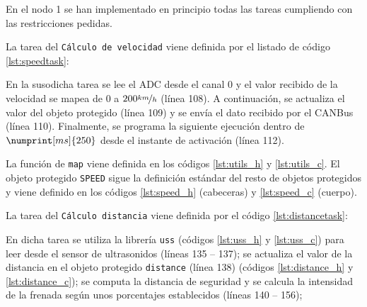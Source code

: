 En el nodo 1 se han implementado en principio todas las tareas cumpliendo con las
restricciones pedidas.

La tarea del \texttt{Cálculo de velocidad} viene definida por el listado de código
\ref{lst:speedtask}:



En la susodicha tarea se lee el ADC desde el canal 0 y el valor recibido de la velocidad
se mapea de $0$ a $200 \nicefrac{km}{h}$ (línea 108). A continuación, se actualiza el valor del
objeto protegido (línea 109) y se envía el dato recibido por el CANBus (línea 110).
Finalmente, se programa la siguiente ejecución dentro de $\numprint[ms]{250}$ desde el
instante de activación (línea 112).

La función de \texttt{map} viene definida en los códigos \ref{lst:utils_h} y \ref{lst:utils_c}.
El objeto protegido \texttt{SPEED} sigue la definición estándar del resto de objetos
protegidos y viene definido en los códigos \ref{lst:speed_h} (cabeceras) y \ref{lst:speed_c}
(cuerpo).

La tarea del \texttt{Cálculo distancia} viene definida por el código \ref{lst:distancetask}:



En dicha tarea se utiliza la librería \texttt{uss} (códigos \ref{lst:uss_h} y \ref{lst:uss_c})
para leer desde el sensor de ultrasonidos (líneas 135 -- 137); se actualiza el valor de la distancia en el
objeto protegido \texttt{distance} (línea 138) (códigos \ref{lst:distance_h} y \ref{lst:distance_c});
se computa la distancia de seguridad y se calcula la intensidad de la frenada
según unos porcentajes establecidos (líneas 140 -- 156);
